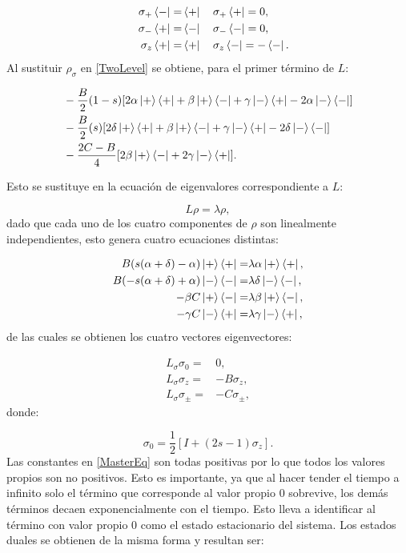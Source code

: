 \documentclass[a4paper,10pt]{report}
\begin{document}
\begin{align*}
&&\sigma_{+}\Bra{-} =& \Bra{+} \quad \sigma_{+}\Bra{+} = 0, \\
&&\sigma_{-}\Bra{+} =& \Bra{-} \quad \sigma_{-}\Bra{-} = 0, \\
&&\sigma_{z}\Bra{+} =& \Bra{+} \quad \sigma_{z}\Bra{-} = -\Bra{-}.
\end{align*} Al sustituir $\rho_{\sigma}$ en \eqref{TwoLevel} se obtiene, para el primer término de $L$:

\begin{align}
&-\frac{B}{2}(1-s)[2\alpha\Ket{+}\Bra{+}+\beta\Ket{+}\Bra{-}+\gamma\Ket{-}\Bra{+}-2\alpha\Ket{-}\Bra{-}]\\
&\nonumber -\frac{B}{2}(s)[2\delta\Ket{+}\Bra{+}+\beta\Ket{+}\Bra{-}+\gamma\Ket{-}\Bra{+}-2\delta\Ket{-}\Bra{-}]\\
&\nonumber -\frac{2C-B}{4}[2\beta\Ket{+}\Bra{-}+2\gamma\Ket{-}\Bra{+}].
\end{align}

Esto se sustituye en la ecuación de eigenvalores correspondiente a $L$:

\begin{equation}
L\rho = \lambda\rho,
\end{equation} dado que cada uno de los cuatro componentes de $\rho$ son linealmente independientes, esto genera cuatro ecuaciones distintas:

\begin{align}
B(s(\alpha+\delta)-\alpha)\Ket{+}\Bra{+} =& \lambda\alpha\Ket{+}\Bra{+},\\
B(-s(\alpha+\delta)+\alpha)\Ket{-}\Bra{-} =& \lambda\delta\Ket{-}\Bra{-},\\
-\beta C \Ket{+}\Bra{-} =& \lambda \beta \Ket{+}\Bra{-}, \\
-\gamma C \Ket{-}\Bra{+} =& \lambda \gamma \Ket{-}\Bra{+},
\end{align}de las cuales se obtienen los cuatro vectores eigenvectores:

\begin{align}
L_\sigma \sigma_0 =& 0, \\
L_\sigma \sigma_z =& -B \sigma_z, \\
L_\sigma \sigma_\pm =& -C \sigma_\pm,
\end{align} donde:

\begin{equation}
\sigma_0 = \frac{1}{2}[I + (2s-1)\sigma_z].
\end{equation} Las constantes en \eqref{MasterEq} son todas positivas por lo que todos los valores propios son no positivos. Esto es importante, ya que al hacer tender el tiempo a infinito solo el término que corresponde al valor propio 0 sobrevive, los demás términos decaen exponencialmente con el tiempo. Esto lleva a identificar al término con valor propio 0 como el estado estacionario del sistema. Los estados duales se obtienen de la misma forma y resultan ser\cite{EnglertDB}:
\end{document}
